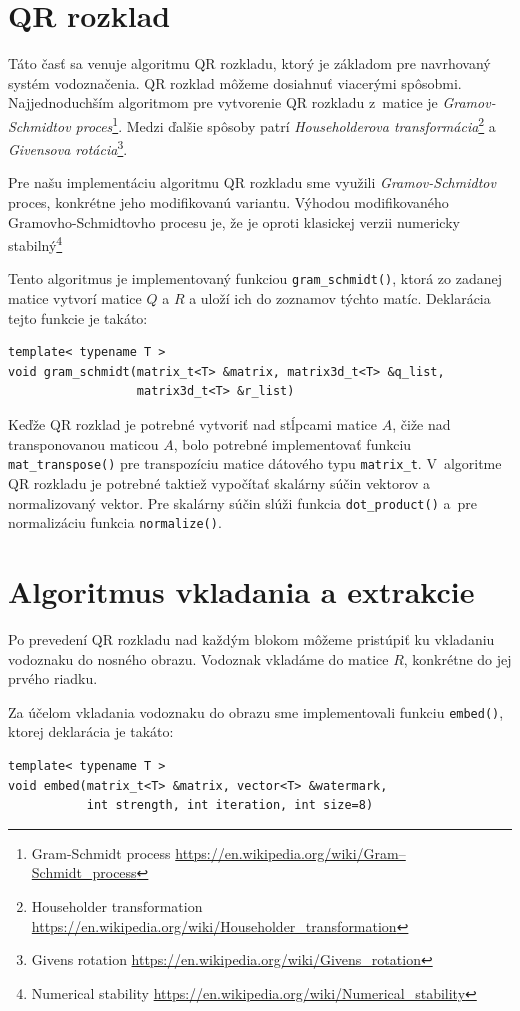\section{QR rozklad}
\label{impl:qr}
Táto časť sa venuje algoritmu QR rozkladu, ktorý je základom pre navrhovaný systém vodoznačenia. QR rozklad môžeme dosiahnuť viacerými spôsobmi. Najjednoduchším algoritmom pre vytvorenie QR rozkladu z~matice je {\it Gramov-Schmidtov proces}\footnote{Gram-Schmidt process \url{https://en.wikipedia.org/wiki/Gram–Schmidt_process}}. Medzi ďalšie spôsoby patrí {\it Householderova transformácia}\footnote{Householder transformation \url{https://en.wikipedia.org/wiki/Householder_transformation}} a {\it Givensova rotácia}\footnote{Givens rotation \url{https://en.wikipedia.org/wiki/Givens_rotation}}.

Pre našu implementáciu algoritmu QR rozkladu sme využili {\it Gramov-Schmidtov} proces, konkrétne jeho modifikovanú variantu. Výhodou modifikovaného Gramovho-Schmidtovho procesu je, že je oproti klasickej verzii numericky stabilný\footnote{Numerical stability \url{https://en.wikipedia.org/wiki/Numerical_stability}} 

Tento algoritmus je implementovaný funkciou {\tt gram\_schmidt()}, ktorá zo zadanej matice vytvorí matice $Q$ a $R$ a uloží ich do zoznamov týchto matíc. Deklarácia tejto funkcie je takáto:
\begin{lstlisting}
template< typename T >
void gram_schmidt(matrix_t<T> &matrix, matrix3d_t<T> &q_list,
                  matrix3d_t<T> &r_list)
\end{lstlisting}

Keďže QR rozklad je potrebné vytvoriť nad stĺpcami matice $A$, čiže nad transponovanou maticou $A$, bolo potrebné implementovať funkciu {\tt mat\_transpose()} pre transpozíciu matice dátového typu {\tt matrix\_t}. V~algoritme QR rozkladu je potrebné taktiež vypočítať skalárny súčin vektorov a normalizovaný vektor. Pre skalárny súčin slúži funkcia {\tt dot\_product()} a~pre normalizáciu funkcia {\tt normalize()}.
\clearpage
\section{Algoritmus vkladania a extrakcie}
\label{impl:embed-extract}
Po prevedení QR rozkladu nad každým blokom môžeme pristúpiť ku vkladaniu vodoznaku do nosného obrazu. Vodoznak vkladáme do matice $R$, konkrétne do jej prvého riadku.

Za účelom vkladania vodoznaku do obrazu sme implementovali funkciu {\tt embed()}, ktorej deklarácia je takáto:
\begin{lstlisting}
template< typename T >
void embed(matrix_t<T> &matrix, vector<T> &watermark,
           int strength, int iteration, int size=8)
\end{lstlisting}

